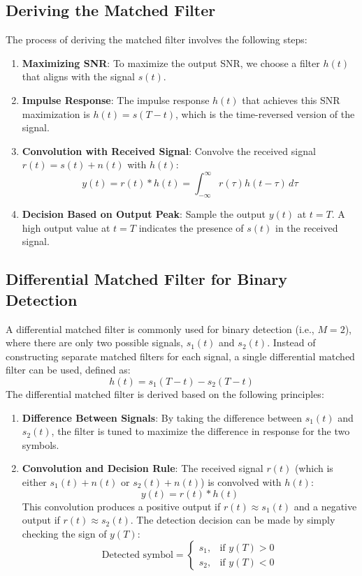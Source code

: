 \documentclass[10pt]{article}
\begin{document}
\subsection{Deriving the Matched Filter}
The process of deriving the matched filter involves the following steps:
\begin{enumerate}
    \item \textbf{Maximizing SNR}: To maximize the output SNR, we choose a filter \( h(t) \) that aligns with the signal \( s(t) \).
    \item \textbf{Impulse Response}: The impulse response \( h(t) \) that achieves this SNR maximization is \( h(t) = s(T - t) \), which is the time-reversed version of the signal.
    \item \textbf{Convolution with Received Signal}: Convolve the received signal \( r(t) = s(t) + n(t) \) with \( h(t) \):
    \[
    y(t) = r(t) * h(t) = \int_{-\infty}^{\infty} r(\tau) h(t - \tau) \, d\tau
    \]
    \item \textbf{Decision Based on Output Peak}: Sample the output \( y(t) \) at \( t = T \). A high output value at \( t = T \) indicates the presence of \( s(t) \) in the received signal.
\end{enumerate}

\subsection{Differential Matched Filter for Binary Detection}
A differential matched filter is commonly used for binary detection (i.e., \( M = 2 \)), where there are only two possible signals, \( s_1(t) \) and \( s_2(t) \). Instead of constructing separate matched filters for each signal, a single differential matched filter can be used, defined as:
\[
h(t) = s_1(T - t) - s_2(T - t)
\]
The differential matched filter is derived based on the following principles:
\begin{enumerate}
    \item \textbf{Difference Between Signals}: By taking the difference between \( s_1(t) \) and \( s_2(t) \), the filter is tuned to maximize the difference in response for the two symbols.
    \item \textbf{Convolution and Decision Rule}: The received signal \( r(t) \) (which is either \( s_1(t) + n(t) \) or \( s_2(t) + n(t) \)) is convolved with \( h(t) \):
    \[
    y(t) = r(t) * h(t)
    \]
    This convolution produces a positive output if \( r(t) \approx s_1(t) \) and a negative output if \( r(t) \approx s_2(t) \). The detection decision can be made by simply checking the sign of \( y(T) \):
    \[
    \text{Detected symbol} =
    \begin{cases}
        s_1, & \text{if } y(T) > 0 \\
        s_2, & \text{if } y(T) < 0
    \end{cases}
    \]
\end{enumerate}
\end{document}
